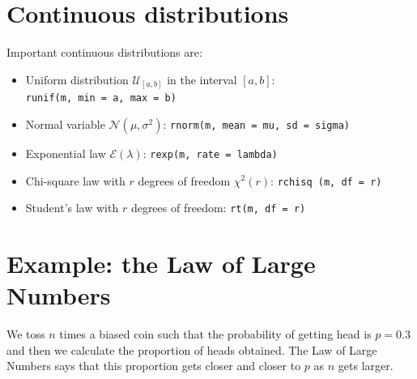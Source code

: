 \documentclass[]{book}
\providecommand{\tightlist}{%
  \setlength{\itemsep}{0pt}\setlength{\parskip}{0pt}}
\begin{document}
\hypertarget{continuous-distributions}{%
\section{Continuous distributions}\label{continuous-distributions}}

Important continuous distributions are:

\begin{itemize}
\tightlist
\item
  Uniform distribution \(\mathcal{U}_{[a, b]}\) in the interval \([a,b]\): \texttt{runif(m,\ min\ =\ a,\ max\ =\ b)}
\item
  Normal variable \(\mathcal{N}(\mu, \sigma^2)\): \texttt{rnorm(m,\ mean\ =\ mu,\ sd\ =\ sigma)}
\item
  Exponential law \(\mathcal{E}(\lambda)\): \texttt{rexp(m,\ rate\ =\ lambda)}
\item
  Chi-square law with \(r\) degrees of freedom \(\mathcal{\chi}^2 (r)\): \texttt{rchisq\ (m,\ df\ =\ r)}
\item
  Student's law with \(r\) degrees of freedom: \texttt{rt(m,\ df\ =\ r)}
\end{itemize}

\hypertarget{example-the-law-of-large-numbers}{%
\section{Example: the Law of Large Numbers}\label{example-the-law-of-large-numbers}}

We toss \(n\) times a biased coin such that the probability of getting head is \(p=0.3\) and then we calculate the proportion of heads obtained. The Law of Large Numbers says that this proportion gets closer and closer to \(p\) as \(n\) gets larger.
\end{document}
